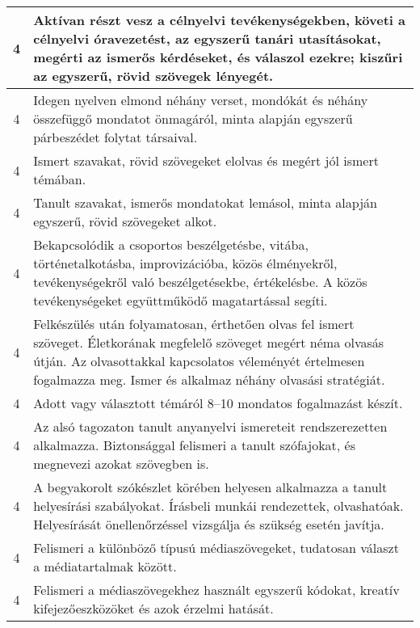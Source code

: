 \begin{longtable}{c | p{12cm} }
                                
                                          4 &  Aktívan részt vesz a célnyelvi tevékenységekben, követi a célnyelvi óravezetést, az egyszerű tanári utasításokat, megérti az ismerős kérdéseket, és válaszol ezekre; kiszűri az egyszerű, rövid szövegek lényegét. \\ \hline
                                          4 &  Idegen nyelven elmond néhány verset, mondókát és néhány összefüggő mondatot önmagáról, minta alapján egyszerű párbeszédet folytat társaival. \\ \hline
                                          4 &  Ismert szavakat, rövid szövegeket elolvas és megért jól ismert témában. \\ \hline
                                          4 &  Tanult szavakat, ismerős mondatokat lemásol, minta alapján egyszerű, rövid szövegeket alkot. \\ \hline
                                          4 &  Bekapcsolódik a csoportos beszélgetésbe, vitába, történetalkotásba, improvizációba, közös élményekről, tevékenységekről való beszélgetésekbe, értékelésbe. A közös tevékenységeket együttműködő magatartással segíti. \\ \hline
                                          4 &  Felkészülés után folyamatosan, érthetően olvas fel ismert szöveget. Életkorának megfelelő szöveget megért néma olvasás útján. Az olvasottakkal kapcsolatos véleményét értelmesen fogalmazza meg. Ismer és alkalmaz néhány olvasási stratégiát. \\ \hline
                                          4 &  Adott vagy választott témáról 8–10 mondatos fogalmazást készít. \\ \hline
                                          4 &  Az alsó tagozaton tanult anyanyelvi ismereteit rendszerezetten alkalmazza. Biztonsággal felismeri a tanult szófajokat, és megnevezi azokat szövegben is. \\ \hline
                                          4 &  A begyakorolt szókészlet körében helyesen alkalmazza a tanult helyesírási szabályokat. Írásbeli munkái rendezettek, olvashatóak. Helyesírását önellenőrzéssel vizsgálja és szükség esetén javítja. \\ \hline
                                          4 &  Felismeri a különböző típusú médiaszövegeket, tudatosan választ a médiatartalmak között. \\ \hline
                                          4 &  Felismeri a médiaszövegekhez használt egyszerű kódokat, kreatív kifejezőeszközöket és azok érzelmi hatását. \\ \hline

\end{longtable}
